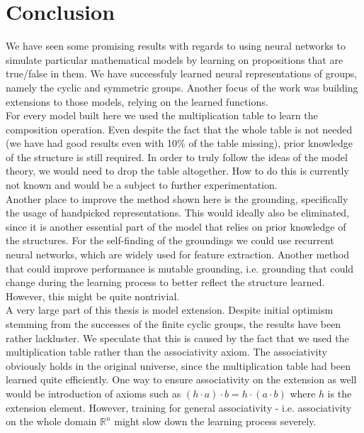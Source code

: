 \chapter*{Conclusion}
We have seen some promising results with regards to using neural networks to simulate particular mathematical models by learning on propositions that are true/false in them. We have successfuly learned neural representations of groups, namely the cyclic and symmetric groups. Another focus of the work was building extensions to those models, relying on the learned functions.\\

For every model built here we used the multiplication table to learn the composition operation. Even despite the fact that the whole table is not needed (we have had good results even with 10\% of the table missing), prior knowledge of the structure is still required. In order to truly follow the ideas of the model theory, we would need to drop the table altogether. How to do this is currently not known and would be a subject to further experimentation.\\

Another place to improve the method shown here is the grounding, specifically the usage of handpicked representations. This would ideally also be eliminated, since it is another essential part of the model that relies on prior knowledge of the structures. For the self-finding of the groundings we could use recurrent neural networks, which are widely used for feature extraction. Another method that could improve performance is mutable grounding, i.e. grounding that could change during the learning process to better reflect the structure learned. However, this might be quite nontrivial.\\

A very large part of this thesis is model extension. Despite initial optimism stemming from the successes of the finite cyclic groups, the results have been rather lackluster. We speculate that this is caused by the fact that we used the multiplication table rather than the associativity axiom. The associativity obviously holds in the original universe, since the multiplication table had been learned quite efficiently. One way to ensure associativity on the extension as well would be introduction of axioms such as $(h\cdot a)\cdot b = h\cdot (a\cdot b)$ where $h$ is the extension element. However, training for general associativity - i.e. associativity on the whole domain $\mathbb{R}^n$ might slow down the learning process severely.\\


